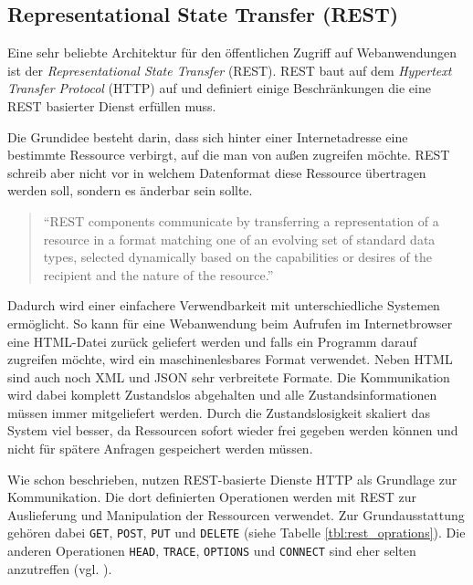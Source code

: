 \subsection{Representational State Transfer (REST)} %
\label{sub:rest}

Eine sehr beliebte Architektur für den öffentlichen Zugriff auf Webanwendungen ist der \emph{Representational State Transfer} (REST). REST baut auf dem \emph{Hypertext Transfer Protocol} (HTTP) auf und definiert einige Beschränkungen die eine REST basierter Dienst erfüllen muss. 

Die Grundidee besteht darin, dass sich hinter einer Internetadresse eine bestimmte Ressource verbirgt, auf die man von außen zugreifen möchte. REST schreib aber nicht vor in welchem Datenformat diese Ressource übertragen werden soll, sondern es änderbar sein sollte. 

\begin{quote}
\enquote{REST components communicate by transferring a representation of a resource
in a format matching one of an evolving set of standard data types, selected dynamically
based on the capabilities or desires of the recipient and the nature of the resource.}\cite[S.\,87]{fielding2000architectural} 
\end{quote}

Dadurch wird einer einfachere Verwendbarkeit mit unterschiedliche Systemen ermöglicht. So kann für eine Webanwendung beim Aufrufen im Internetbrowser eine HTML-Datei zurück geliefert werden und falls ein Programm darauf zugreifen möchte, wird ein maschinenlesbares Format verwendet. Neben HTML sind auch noch XML und JSON sehr verbreitete Formate. Die Kommunikation wird dabei komplett Zustandslos abgehalten und alle Zustandsinformationen müssen immer mitgeliefert werden. Durch die Zustandslosigkeit skaliert das System viel besser, da Ressourcen sofort wieder frei gegeben werden können und nicht für spätere Anfragen gespeichert werden müssen.

Wie schon beschrieben, nutzen REST-basierte Dienste HTTP als Grundlage zur Kommunikation. Die dort definierten Operationen werden mit REST zur Auslieferung und Manipulation der Ressourcen verwendet. Zur Grundausstattung  gehören dabei \texttt{GET}, \texttt{POST}, \texttt{PUT} und \texttt{DELETE} (siehe Tabelle \ref{tbl:rest_oprations}). Die anderen Operationen \texttt{HEAD}, \texttt{TRACE}, \texttt{OPTIONS} und \texttt{CONNECT} sind eher selten anzutreffen (vgl. \cite[S.\,76ff]{fielding2000architectural}). 

